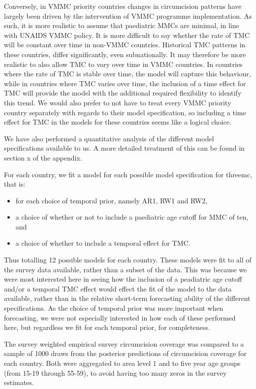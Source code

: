 \documentclass[a4paper, 12pt]{article}
\begin{document}
Conversely, in VMMC priority countries changes in circumcision patterns have largely been driven by the intervention of VMMC programme implementation. 
As such, it is more realistic to assume that paediatric MMCs are minimal, in line with UNAIDS VMMC policy.
It is more difficult to say whether the rate of TMC will be constant over time in non-VMMC countries.
Historical TMC patterns in these countries, differ significantly, even subnationally.
It may therefore be more realistic to also allow TMC to vary over time in VMMC countries.
In countries where the rate of TMC is stable over time, the model will capture this behaviour, while in countries where TMC varies over time, the inclusion of a time effect for TMC will provide the model with the additional required flexibility to identify this trend.
We would also prefer to not have to treat every VMMC priority country separately with regards to their model specification, so including a time effect for TMC in the models for these countries seems like a logical choice. 

We have also performed a quantitative analysis of the different model specifications available
to us. A more detailed treatment of this can be found in section x of the appendix. 

For each country, we fit a model for each possible model specification for threemc, that is:
\begin{itemize}
\item for each choice of temporal prior, namely AR1, RW1 and RW2,
\item a choice of whether or not to include a paediatric age cutoff for MMC of ten, and
\item a choice of whether to include a temporal effect for TMC.
\end{itemize}
Thus totalling 12 possible models for each country.
These models were fit to all of the survey data available, rather than a subset of the data.
This was because we were most interested here in seeing how the inclusion of a peadiatric age cutoff and/or a temporal TMC effect would effect the fit of the model to the data available, rather than in the relative short-term forecasting ability of the different specifications.
As the choice of temporal prior was more important when forecasting, we were not especially interested in how each of these performed here, but regardless we fit for each temporal prior, for completeness. 

The survey weighted empirical survey circumcision coverage was compared to a sample of 1000 draws from the posterior predictions of circumcision coverage for each country.
Both were aggregated to area level 1 and to five year age groups (from 15-19 through 55-59), to avoid having too many zeros in the survey estimates.
\end{document}
